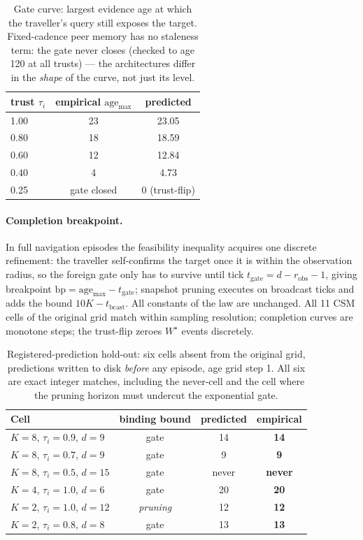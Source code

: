\documentclass{article}
\newcommand{\wstar}{W^{\star}}
\begin{document}
\begin{table}[h]
\centering
\caption{Gate curve: largest evidence age at which the traveller's
query still exposes the target. Fixed-cadence peer memory has no
staleness term: the gate never closes (checked to age 120 at all
trusts) --- the architectures differ in the \emph{shape} of the curve,
not just its level.}
\label{tab:gate}
\small
\begin{tabular}{lcc}
\toprule
trust $\tau_i$ & empirical $\mathrm{age}_{\max}$ & predicted \\
\midrule
1.00 & 23 & 23.05 \\
0.80 & 18 & 18.59 \\
0.60 & 12 & 12.84 \\
0.40 & 4  & 4.73 \\
0.25 & gate closed & 0 (trust-flip) \\
\bottomrule
\end{tabular}
\end{table}

\paragraph{Completion breakpoint.} In full navigation episodes the
feasibility inequality acquires one discrete refinement: the traveller
self-confirms the target once it is within the observation radius, so
the foreign gate only has to survive until tick $t_{\text{gate}} = d -
r_{\text{obs}} - 1$, giving breakpoint $\mathrm{bp} =
\mathrm{age}_{\max} - t_{\text{gate}}$; snapshot pruning executes on
broadcast ticks and adds the bound $10K - t_{\text{bcast}}$. All
constants of the law are unchanged. All 11 CSM cells of the original
grid match within sampling resolution; completion curves are monotone
steps; the trust-flip zeroes $\wstar$ events discretely.

\begin{table}[h]
\centering
\caption{Registered-prediction hold-out: six cells absent from the
original grid, predictions written to disk \emph{before} any episode,
age grid step 1. All six are exact integer matches, including the
never-cell and the cell where the pruning horizon must undercut the
exponential gate.}
\label{tab:holdout}
\small
\begin{tabular}{lccc}
\toprule
Cell & binding bound & predicted & empirical \\
\midrule
$K{=}8$, $\tau_i{=}0.9$, $d{=}9$  & gate    & 14 & \textbf{14} \\
$K{=}8$, $\tau_i{=}0.7$, $d{=}9$  & gate    & 9  & \textbf{9}  \\
$K{=}8$, $\tau_i{=}0.5$, $d{=}15$ & gate    & never & \textbf{never} \\
$K{=}4$, $\tau_i{=}1.0$, $d{=}6$  & gate    & 20 & \textbf{20} \\
$K{=}2$, $\tau_i{=}1.0$, $d{=}12$ & \emph{pruning} & 12 & \textbf{12} \\
$K{=}2$, $\tau_i{=}0.8$, $d{=}8$  & gate    & 13 & \textbf{13} \\
\bottomrule
\end{tabular}
\end{table}
\end{document}
